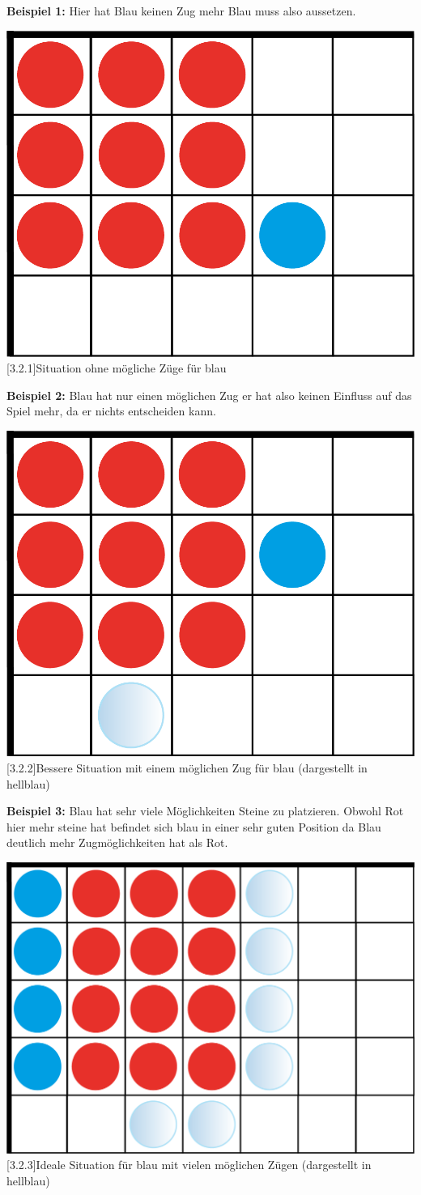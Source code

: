 \documentclass[12pt,a4paper,bibliography=totocnumbered,listof=totocnumbered]{scrartcl}
\begin{document}
    \textbf{Beispiel 1:} Hier hat Blau keinen Zug mehr Blau muss also aussetzen.

   	\vspace{1em}
	\begin{minipage}{\linewidth}
		\centering
		\includegraphics[width=0.33\linewidth]{pics/Kapitel_3/Kapitel_3_pic5.png}
		[3.2.1]{Situation ohne mögliche Züge für blau}
		\label{fig:3.2.1}
	\end{minipage}
	\vspace{1em}
	
    \textbf{Beispiel 2:} Blau hat nur einen möglichen Zug er hat also keinen Einfluss auf das Spiel mehr, da er nichts entscheiden kann.

   	\vspace{1em}
	\begin{minipage}{\linewidth}
		\centering
		\includegraphics[width=0.33\linewidth]{pics/Kapitel_3/Kapitel_3_pic6.png}
		[3.2.2]{Bessere Situation mit einem möglichen Zug für blau (dargestellt in hellblau)}
		\label{fig:3.2.2}
	\end{minipage}
	\vspace{1em}
	
    \textbf{Beispiel 3:} Blau hat sehr viele Möglichkeiten Steine zu platzieren. Obwohl Rot hier mehr steine hat befindet sich blau in einer sehr guten Position da Blau deutlich mehr Zugmöglichkeiten hat als Rot.

   	\vspace{1em}
	\begin{minipage}{\linewidth}
		\centering
		\includegraphics[width=0.33\linewidth]{pics/Kapitel_3/Kapitel_3_pic7.png}
		[3.2.3]{Ideale Situation für blau mit vielen möglichen Zügen (dargestellt in hellblau)}
		\label{fig:3.2.3}
	\end{minipage}
	\vspace{1em}
	
\end{document}

